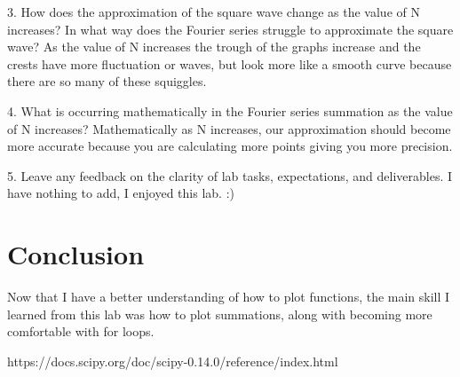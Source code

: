 \documentclass[12pt]{report}
\begin{document}
3. How does the approximation of the square wave change as the value of N increases? In what way does the Fourier series struggle to approximate the square wave?
    As the value of N increases the trough of the graphs increase and the crests have more fluctuation or waves, but look more like a smooth curve because there are so many of these squiggles. 

4. What is occurring mathematically in the Fourier series summation as the value of N increases?
    Mathematically as N increases, our approximation should become more accurate because you are calculating more points giving you more precision. 

5. Leave any feedback on the clarity of lab tasks, expectations, and deliverables.
    I have nothing to add, I enjoyed this lab. :)

\section{Conclusion}

Now that I have a better understanding of how to plot functions, the main skill I learned from this lab was how to plot summations, along with becoming more comfortable with for loops. 

\newpage


\begin{thebibliography}{111}

https://docs.scipy.org/doc/scipy-0.14.0/reference/index.html




\end{thebibliography}
\end{document}
